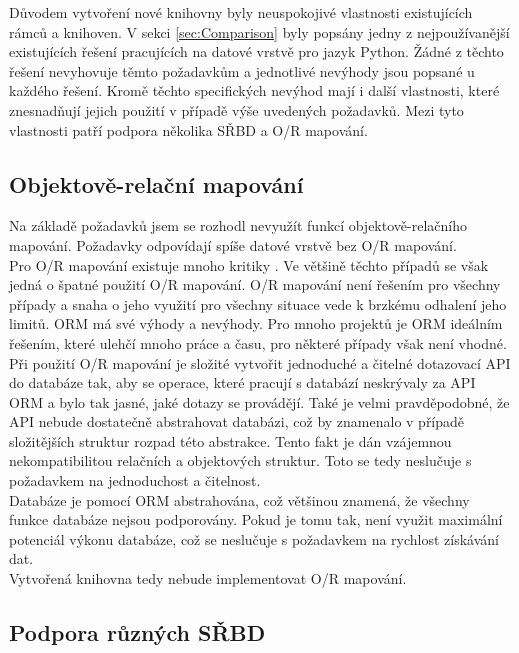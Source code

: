 \documentclass[ing,male,java,dept456]{diploma}						%
\begin{document}
Důvodem vytvoření nové knihovny byly neuspokojivé vlastnosti existujících rámců a knihoven. V sekci \ref{sec:Comparison} byly popsány jedny z nejpoužívanější existujících řešení pracujících na datové vrstvě pro jazyk Python. Žádné z těchto řešení nevyhovuje těmto požadavkům a jednotlivé nevýhody jsou popsané u každého řešení. Kromě těchto specifických nevýhod mají i další vlastnosti, které znesnadňují jejich použití v případě výše uvedených požadavků. Mezi tyto vlastnosti patří podpora několika SŘBD a O/R mapování. 

\subsection{Objektově-relační mapování}

Na základě požadavků jsem se rozhodl nevyužít funkcí objektově-relačního mapování. Požadavky odpovídají spíše datové vrstvě bez O/R mapování. \\
Pro O/R mapování existuje mnoho kritiky \cite{seldo, fowler-orm, dbprogrammer-orm, mehdi}. Ve většině těchto případů se však jedná o špatné použití O/R mapování. O/R mapování není řešením pro všechny případy a snaha o jeho využití pro všechny situace vede k brzkému odhalení jeho limitů. ORM má své výhody a nevýhody. Pro mnoho projektů je ORM ideálním řešením, které ulehčí mnoho práce a času, pro některé případy však není vhodné. \\
Při použití O/R mapování je složité vytvořit jednoduché a čitelné dotazovací API do databáze tak, aby se operace, které pracují s databází neskrývaly za API ORM a bylo tak jasné, jaké dotazy se provádějí. Také je velmi pravděpodobné, že API nebude dostatečně abstrahovat databázi, což by znamenalo v případě složitějších struktur rozpad této abstrakce. Tento fakt je dán vzájemnou nekompatibilitou relačních a objektových struktur. Toto se tedy neslučuje s požadavkem na jednoduchost a čitelnost. \\
Databáze je pomocí ORM abstrahována, což většinou znamená, že všechny funkce databáze nejsou podporovány. Pokud je tomu tak, není využit maximální potenciál výkonu databáze, což se neslučuje s požadavkem na rychlost získávání dat. \\
Vytvořená knihovna tedy nebude implementovat O/R mapování. 

\subsection{Podpora různých SŘBD}
\end{document}
